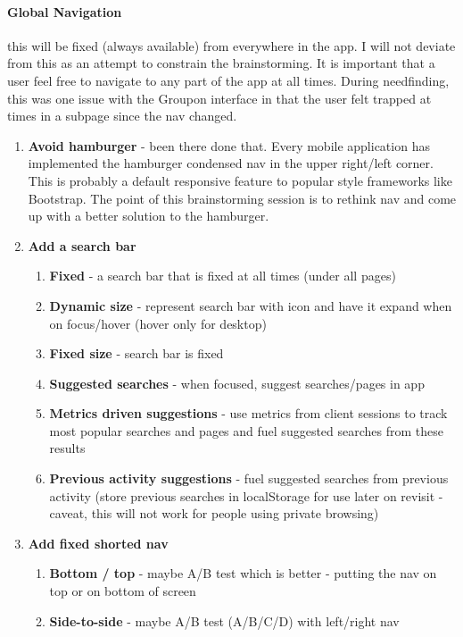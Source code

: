\paragraph{Global Navigation} this will be fixed (always available) from everywhere in the app. I will not deviate from this as an attempt to constrain the brainstorming. It is important that a user feel free to navigate to any part of the app at all times. During needfinding, this was one issue with the Groupon interface in that the user felt trapped at times in a subpage since the nav changed.
\begin{enumerate}
\item
  \textbf{Avoid hamburger} - been there done that. Every mobile application has implemented the hamburger condensed nav in the upper right/left corner. This is probably a default responsive feature to popular style frameworks like Bootstrap. The point of this brainstorming session is to rethink nav and come up with a better solution to the hamburger.
\item
  \textbf{Add a search bar}
  \begin{enumerate}
  \item
    \textbf{Fixed} - a search bar that is fixed at all times (under all pages)
  \item
    \textbf{Dynamic size} - represent search bar with icon and have it expand when on focus/hover (hover only for desktop)
  \item
    \textbf{Fixed size} - search bar is fixed
  \item
    \textbf{Suggested searches} - when focused, suggest searches/pages in app
  \item
    \textbf{Metrics driven suggestions} - use metrics from client sessions to track most popular searches and pages and fuel suggested searches from these results
  \item
    \textbf{Previous activity suggestions} - fuel suggested searches from previous activity (store previous searches in localStorage for use later on revisit - caveat, this will not work for people using private browsing)
  \end{enumerate}
\item
  \textbf{Add fixed shorted nav}
  \begin{enumerate}
  \item
    \textbf{Bottom / top} - maybe A/B test which is better - putting the nav on top or on bottom of screen
  \item
    \textbf{Side-to-side} - maybe A/B test (A/B/C/D) with left/right nav

\end{enumerate}
\end{enumerate}
